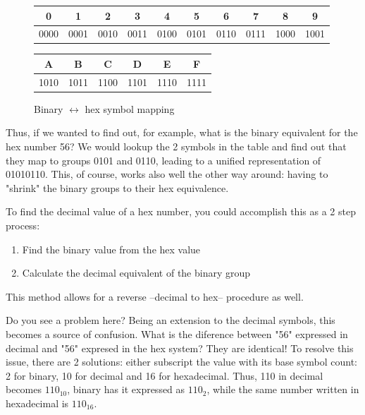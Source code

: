\documentclass[12pt, a4paper]{book}
\begin{document}
\begin{figure}[h]
  \centering
  \renewcommand{\arraystretch}{1.5}
  \begin{tabular}{c | c | c | c | c | c | c | c | c | c}
    {\Large 0} & {\Large 1} & {\Large 2} & {\Large 3} & {\Large 4} & {\Large 5} & {\Large 6} & {\Large 7} & {\Large 8} & {\Large 9} \\ \hline
    {\large 0000} & {\large 0001} & {\large 0010} & {\large 0011} & {\large 0100} & {\large 0101} & {\large 0110} & {\large 0111} & {\large 1000} & {\large 1001} \\
  \end{tabular}
  \vspace{0.5cm}

  \begin{tabular}{ c | c | c | c | c | c }
     {\Large A} & {\Large B} & {\Large C} & {\Large D} & {\Large E} & {\Large F} \\ \hline
     {\large 1010} & {\large 1011} & {\large 1100} & {\large 1101} & {\large 1110} & {\large 1111}\\  
  \end{tabular}
  
  \renewcommand{\arraystretch}{1.0}
  \caption{Binary $\leftrightarrow$ hex symbol mapping}
  \label{fig:binary-hex complete mapping}
\end{figure}

Thus, if we wanted to find out, for example, what is the binary equivalent for the hex number 56? We would lookup the 2 symbols in the table and find out that they map to groups 0101 and 0110, leading to a unified representation of 01010110. This, of course, works also well the other way around: having to "shrink" the binary groups to their hex equivalence.

To find the decimal value of a hex number, you could accomplish this as a 2 step process:
\begin{enumerate}
  \item Find the binary value from the hex value
  \item Calculate the decimal equivalent of the binary group
\end{enumerate}
This method allows for a reverse --decimal to hex-- procedure as well.

Do you see a problem here? Being an extension to the decimal symbols, this becomes a source of confusion. What is the diference between "56" expressed in  decimal and "56" expresed in the hex system? They are identical! To resolve this issue, there are 2 solutions: either subscript the value with its base symbol count: 2 for binary, 10 for decimal and 16 for hexadecimal. Thus, 110 in decimal becomes $110_{10}$, binary has it expressed as $110_2$, while the same number written in hexadecimal is $110_{16}$.
\end{document}
